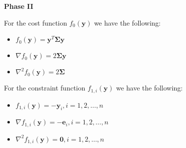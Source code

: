 \documentclass{beamer}
\begin{document}
\begin{frame}

\textbf{Phase II}

\vspace{0.8cm}
\justifying

\justifying
For the cost function $f_{0}\left(\mathbf{y}\right)$ we have the following:
\begin{itemize}
	\item $f_{0}\left(\mathbf{y}\right) = \mathbf{y}^{T}\mathbf{\Sigma}\mathbf{y}$
	\item $\nabla f_{0}\left(\mathbf{y}\right) = 2\mathbf{\Sigma}\mathbf{y}$
	\item $\nabla^{2}f_{0}\left(\mathbf{y}\right) = 2\mathbf{\Sigma}$
\end{itemize}

\vspace{0.8cm}
\justifying
For the constraint function $f_{1,i}\left(\mathbf{y}\right)$ we have the following:
\begin{itemize}
	\item $f_{1,i}\left(\mathbf{y}\right) = - \mathbf{y}_{i}, i=1,2,\dots,n$
	\item $\nabla f_{1,i}\left(\mathbf{y}\right) = - \mathbf{e}_{i}, i=1,2,\dots,n$
	\item $\nabla^{2}f_{1,i}\left(\mathbf{y}\right) = \mathbf{0}, i=1,2,\dots,n$
\end{itemize}

\end{frame}
\end{document}

